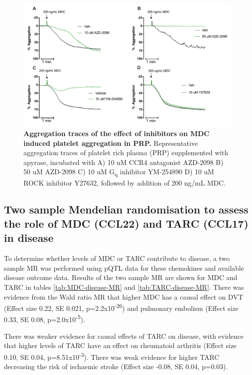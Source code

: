 \documentclass[11pt,twoside]{bristolthesis}
\begin{document}
\begin{figure}
\includegraphics[width=0.95\linewidth]{figure/Chemokines/Layouts/MDC_inhibitors_aggregation_traces} \caption[Aggregation traces of the effect of inhibitors on MDC induced platelet aggregation in PRP.]{\textbf{Aggregation traces of the effect of inhibitors on MDC induced platelet aggregation in PRP.} Representative aggregation traces of platelet rich plasma (PRP) supplemented with apyrase, incubated with A) 10 uM CCR4 antagonist AZD-2098 B) 50 uM AZD-2098 C) 10 uM G\textsubscript{q} inhibitor YM-254890 D) 10 uM ROCK inhibitor Y27632, followed by addition of 200 ng/mL MDC.}\label{fig:MDC-PRP-agg-trace}
\end{figure}
\hypertarget{two-sample-mendelian-randomisation-to-assess-the-role-of-mdc-ccl22-and-tarc-ccl17-in-disease}{%
\subsection{Two sample Mendelian randomisation to assess the role of MDC (CCL22) and TARC (CCL17) in disease}\label{two-sample-mendelian-randomisation-to-assess-the-role-of-mdc-ccl22-and-tarc-ccl17-in-disease}}

To determine whether levels of MDC or TARC contribute to disease, a two sample MR was performed using pQTL data for these chemokines and available disease outcome data. Results of the two sample MR are shown for MDC and TARC in tables \ref{tab:MDC-disease-MR} and \ref{tab:TARC-disease-MR}. There was evidence from the Wald ratio MR that higher MDC has a causal effect on DVT (Effect size 0.22, SE 0.021, p=2.2x10\textsuperscript{-26}) and pulmonary embolism (Effect size 0.33, SE 0.08, p=2.0x10\textsuperscript{-5}).

There was weaker evidence for causal effects of TARC on disease, with evidence that higher levels of TARC have an effect on rheumatoid arthritis (Effect size 0.10, SE 0.04, p=8.51x10\textsuperscript{-3}). There was weak evidence for higher TARC decreasing the risk of ischaemic stroke (Effect size -0.08, SE 0.04, p=0.03).
\end{document}
